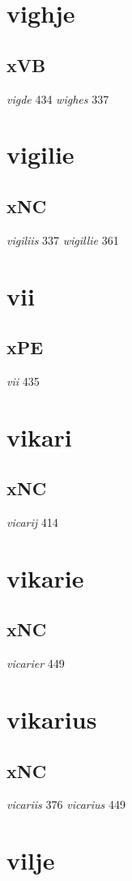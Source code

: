 \documentclass[a4paper,twocolumn]{article}
\begin{document}
\section{vighje}
\label{sec:org9a0c35e}
\subsection{xVB}
\label{sec:org7ea54f0}
\emph{vigde} 434 \emph{wighes} 337 
\section{vigilie}
\label{sec:org42a467d}
\subsection{xNC}
\label{sec:orgf989ed7}
\emph{vigiliis} 337 \emph{wigillie} 361 
\section{vii}
\label{sec:org97f98c9}
\subsection{xPE}
\label{sec:org5571765}
\emph{vii} 435 
\section{vikari}
\label{sec:orgcc7686d}
\subsection{xNC}
\label{sec:orgbc1d239}
\emph{vicarij} 414 
\section{vikarie}
\label{sec:orgdba8e0a}
\subsection{xNC}
\label{sec:org27444e3}
\emph{vicarier} 449 
\section{vikarius}
\label{sec:orgf65811a}
\subsection{xNC}
\label{sec:org0591ab2}
\emph{vicariis} 376 \emph{vicarius} 449 
\section{vilje}
\label{sec:org42b19c0}
\end{document}
